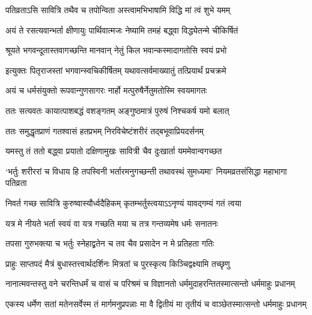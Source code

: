 


\twolineshloka
{पतिव्रताऽसि सावित्रि तथैव च तपोन्विता}
{अस्त्वामभिभाषामि विद्धि मां त्वं शुभे यमम्}


\twolineshloka
{अयं ते रसत्यवान्भर्ता क्षीणायुः पार्थिवात्मजः}
{नेष्यामि तमहं बद्ध्वा विद्ध्येतन्मे चीकिर्षितं}




\twolineshloka
{श्रूयते भगवन्दूतास्तवागच्छन्ति मानवान्}
{नेतुं किल भवान्कस्मादागतोसि स्वयं प्रभो}




\twolineshloka
{इत्युक्तः पितृराजस्तां भगवान्स्वचिकीर्षितम्}
{यथावत्सर्वमाख्यातुं तत्प्रियार्थं प्रचक्रमे}


\twolineshloka
{अयं च धर्मसंयुक्तो रूपवान्गुणसागरः}
{नार्हो मत्पुरुषैर्नेतुमतोस्मि स्वयमागतः}


\twolineshloka
{ततः सत्यवतः कायात्पाशबद्धं वशङ्गतम्}
{अङ्गुष्ठमात्रं पुरुषं निश्चकर्ष यमो बलात्}


\twolineshloka
{ततः समुद्धृतप्राणं गतश्वासं हतप्रभम्}
{निरविचेष्टंशरीरं तद्बभूवाप्रियदर्सनम्}


\twolineshloka
{यमस्तु तं ततो बद्ध्वा प्रयातो दक्षिणामुखः}
{सावित्री चैव दुःखार्ता यममेवान्वगच्छत}


\fourlineindentedshloka
{`भर्तुः शरीररां च विधाय हि तपस्विनी}
{भर्तारमनुगच्छन्ती तथावस्थं सुमध्यमा'}
{नियमव्रतसंसिद्धा महाभागा पतिव्रता}




\twolineshloka
{निवर्त गच्छ सावित्रि कुरुष्वास्यौर्ध्वदैहिकम्}
{कृतम्भर्तुस्त्वयाऽऽनृण्यं यावद्गम्यं गतं त्वया}




\twolineshloka
{यत्र मे नीयते भर्ता स्वयं वा यत्र गच्छति}
{मया च तत्र गन्तव्यमेष धर्मः सनातनः}


\twolineshloka
{तपसा गुरुभक्त्या च भर्तुः स्नेहाद्व्रतेन च}
{तव चैव प्रसादेन न मे प्रतिहता गतिः}


\twolineshloka
{प्राहुः साप्तपदं मैत्रं बुधास्तत्त्वार्थदर्शिनः}
{मित्रतां च पुरस्कृत्य किञ्चिद्वक्ष्यामि तच्छृणु}


\twolineshloka
{नानात्मवन्तस्तु वने चरन्तिधर्मं च वासं च परिश्रमं च}
{विज्ञानतो धर्ममुदाहरन्तितस्मात्सन्तो धर्ममाहुः प्रधानम्}


\twolineshloka
{एकस्य धर्मेण सतां मतेनसर्वेस्म तं मार्गमनुप्रपन्नाः}
{मा वै द्वितीयं मा तृतीयं च वाञ्छेतस्मात्सन्तो धर्ममाहुः प्रधानम्}


